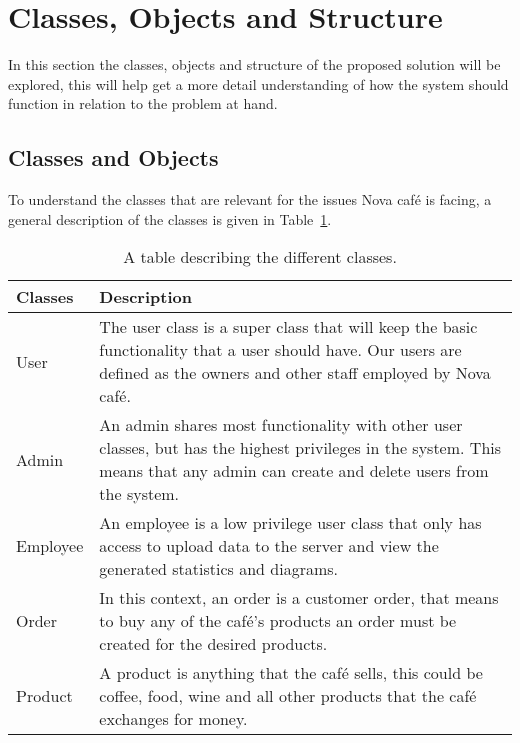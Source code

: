 \section{Classes, Objects and Structure}\label{sec:classes-objects-and-structure}

In this section the classes, objects and structure of the proposed solution will be explored, this
will help get a more detail understanding of how the system should function in relation to the problem at hand.


\subsection{Classes and Objects}\label{subsec:classes-and-objects}
To understand the classes that are relevant for the issues Nova café is facing,
a general description of the classes is given in Table~\ref{tab:class-table}.

\begin{table}[H]
    \centering
    \begin{tabular} { m{2.5cm} m{10cm} }
        \toprule
        \textbf{Classes} & \textbf{Description} \\
        \midrule
        User & The user class is a super class that will keep the
        basic functionality that a user should have.
        Our users are defined as the owners and other staff employed by Nova café. \\
        \midrule
        Admin & An admin shares most functionality with other user classes,
        but has the highest privileges in the system.
        This means that any admin can create and delete users from the system. \\
        \midrule
        Employee & An employee is a low privilege user class
        that only has access to upload data to the server and
        view the generated statistics and diagrams. \\
        \midrule
        Order & In this context, an order is a customer order,
        that means to buy any of the café's products an order must be created
        for the desired products. \\
        \midrule
        Product & A product is anything that the café sells,
        this could be coffee, food, wine and all other products that
        the café exchanges for money. \\
        \bottomrule
    \end{tabular}
    \caption{A table describing the different classes.}\label{tab:class-table}
\end{table}

